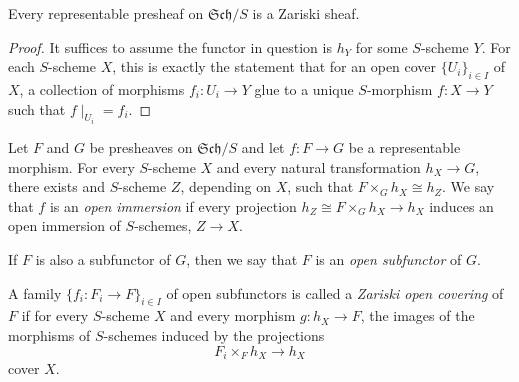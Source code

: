 \documentclass[10pt]{amsart}
\begin{document}
\begin{cor}
  Every representable presheaf on $\mathfrak{Sch}/S$ is a Zariski sheaf.
  \begin{proof}
    It suffices to assume the functor in question is $h_Y$ for some $S$-scheme $Y$.
    For each $S$-scheme $X$, this is exactly the statement that for an open cover $\{U_i\}_{i \in I}$ of $X$, a collection of morphisms $f_i \colon U_i \rightarrow Y$ glue to a unique $S$-morphism $f : X \rightarrow Y$ such that $f\mid_{U_i} = f_i$.
  \end{proof}
\end{cor}

\begin{defn}
  Let $F$ and $G$ be presheaves on $\mathfrak{Sch}/S$ and let $f \colon F \rightarrow G$ be a representable morphism.
  For every $S$-scheme $X$ and every natural transformation $h_X \rightarrow G$, there exists and $S$-scheme $Z$, depending on $X$, such that $F \times_G h_X \cong h_Z$.
  We say that $f$ is an {\em open immersion} if every projection $h_Z \cong F \times_G h_X \rightarrow h_X$ induces an open immersion of $S$-schemes, $Z \rightarrow X$.
  
  If $F$ is also a subfunctor of $G$, then we say that $F$ is an {\em open subfunctor} of $G$.
\end{defn}

\begin{defn}
  A family $\{f_i : F_i \rightarrow F\}_{i \in I}$ of open subfunctors is called a {\em Zariski open covering} of $F$ if for every $S$-scheme $X$ and every morphism $g \colon h_X \rightarrow F$, the images of the morphisms of $S$-schemes induced by the projections
  $$F_i \times_F h_X \rightarrow h_X$$
  cover $X$.
\end{defn}
\end{document}
